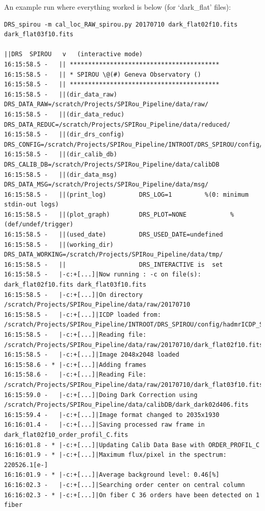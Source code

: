 An example run where everything worked is below (for `dark\_flat' files):

\begin{lstlisting}[style=text]
DRS_spirou -m cal_loc_RAW_spirou.py 20170710 dark_flat02f10.fits dark_flat03f10.fits

||DRS  SPIROU   v   (interactive mode)
16:15:58.5 -   || *****************************************
16:15:58.5 -   || * SPIROU \@(#) Geneva Observatory ()
16:15:58.5 -   || *****************************************
16:15:58.5 -   ||(dir_data_raw)      DRS_DATA_RAW=/scratch/Projects/SPIRou_Pipeline/data/raw/
16:15:58.5 -   ||(dir_data_reduc)    DRS_DATA_REDUC=/scratch/Projects/SPIRou_Pipeline/data/reduced/
16:15:58.5 -   ||(dir_drs_config)    DRS_CONFIG=/scratch/Projects/SPIRou_Pipeline/INTROOT/DRS_SPIROU/config/
16:15:58.5 -   ||(dir_calib_db)      DRS_CALIB_DB=/scratch/Projects/SPIRou_Pipeline/data/calibDB
16:15:58.5 -   ||(dir_data_msg)      DRS_DATA_MSG=/scratch/Projects/SPIRou_Pipeline/data/msg/
16:15:58.5 -   ||(print_log)         DRS_LOG=1         %(0: minimum stdin-out logs)
16:15:58.5 -   ||(plot_graph)        DRS_PLOT=NONE            %(def/undef/trigger)
16:15:58.5 -   ||(used_date)         DRS_USED_DATE=undefined
16:15:58.5 -   ||(working_dir)       DRS_DATA_WORKING=/scratch/Projects/SPIRou_Pipeline/data/tmp/
16:15:58.5 -   ||                    DRS_INTERACTIVE is  set
16:15:58.5 -   |-c:+[...]|Now running : -c on file(s):  dark_flat02f10.fits dark_flat03f10.fits
16:15:58.5 -   |-c:+[...]|On directory /scratch/Projects/SPIRou_Pipeline/data/raw/20170710
16:15:58.5 -   |-c:+[...]|ICDP loaded from: /scratch/Projects/SPIRou_Pipeline/INTROOT/DRS_SPIROU/config/hadmrICDP_SPIROU.py
16:15:58.5 -   |-c:+[...]|Reading file: /scratch/Projects/SPIRou_Pipeline/data/raw/20170710/dark_flat02f10.fits
16:15:58.5 -   |-c:+[...]|Image 2048x2048 loaded
16:15:58.6 - * |-c:+[...]|Adding frames
16:15:58.6 -   |-c:+[...]|Reading File: /scratch/Projects/SPIRou_Pipeline/data/raw/20170710/dark_flat03f10.fits
16:15:59.0 -   |-c:+[...]|Doing Dark Correction using /scratch/Projects/SPIRou_Pipeline/data/calibDB/dark_dark02d406.fits
16:15:59.4 -   |-c:+[...]|Image format changed to 2035x1930
16:16:01.4 -   |-c:+[...]|Saving processed raw frame in dark_flat02f10_order_profil_C.fits
16:16:01.8 - * |-c:+[...]|Updating Calib Data Base with ORDER_PROFIL_C
16:16:01.9 - * |-c:+[...]|Maximum flux/pixel in the spectrum: 220526.1[e-]
16:16:01.9 - * |-c:+[...]|Average background level: 0.46[%]
16:16:02.3 -   |-c:+[...]|Searching order center on central column
16:16:02.3 - * |-c:+[...]|On fiber C 36 orders have been detected on 1 fiber

\end{lstlisting}
